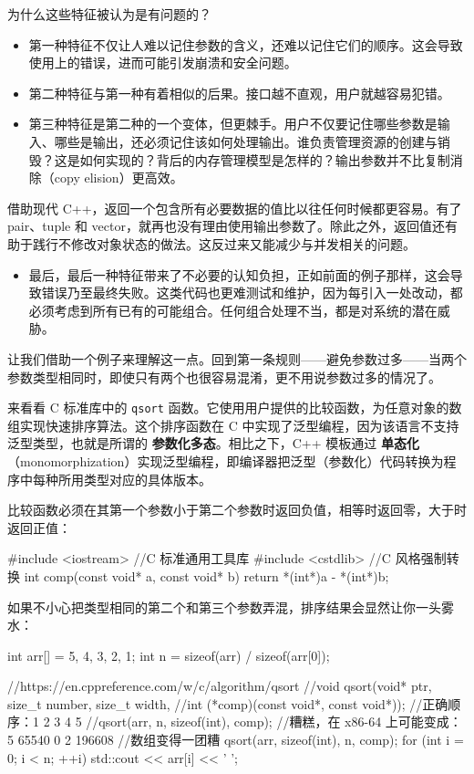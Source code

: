 为什么这些特征被认为是有问题的？

\begin{itemize}
\label{idx:998}
\item 第一种特征不仅让人难以记住参数的含义，还难以记住它们的顺序。这会导致使用上的错误，进而可能引发崩溃和安全问题。
\item 第二种特征与第一种有着相似的后果。接口越不直观，用户就越容易犯错。
\item 第三种特征是第二种的一个变体，但更棘手。用户不仅要记住哪些参数是输入、哪些是输出，还必须记住该如何处理输出。谁负责管理资源的创建与销毁？这是如何实现的？背后的内存管理模型是怎样的？输出参数并不比复制消除（copy elision）更高效。
\end{itemize}

借助现代 C++，返回一个包含所有必要数据的值比以往任何时候都更容易。有了 pair、tuple 和 vector，就再也没有理由使用输出参数了。除此之外，返回值还有助于践行不修改对象状态的做法。这反过来又能减少与并发相关的问题。

\begin{itemize}
\item 最后，最后一种特征带来了不必要的认知负担，正如前面的例子那样，这会导致错误乃至最终失败。这类代码也更难测试和维护，因为每引入一处改动，都必须考虑到所有已有的可能组合。任何组合处理不当，都是对系统的潜在威胁。
\end{itemize}

让我们借助一个例子来理解这一点。回到第一条规则——避免参数过多——当两个参数类型相同时，即使只有两个也很容易混淆，更不用说参数过多的情况了。

\label{idx:999}
\label{idx:1000}
\label{idx:1001}
来看看 C 标准库中的 \texttt{qsort} 函数。它使用用户提供的比较函数，为任意对象的数组实现快速排序算法。这个排序函数在 C 中实现了泛型编程，因为该语言不支持泛型类型，也就是所谓的 \textbf{参数化多态}。相比之下，C++ 模板通过 \textbf{单态化}（monomorphization）实现泛型编程，即编译器把泛型（参数化）代码转换为程序中每种所用类型对应的具体版本。

比较函数必须在其第一个参数小于第二个参数时返回负值，相等时返回零，大于时返回正值：

\begin{codebox}[cpp]
#include <iostream>
//C 标准通用工具库
#include <cstdlib>
//C 风格强制转换
int comp(const void* a, const void* b) {
  return *(int*)a - *(int*)b;
}
\end{codebox}

如果不小心把类型相同的第二个和第三个参数弄混，排序结果会显然让你一头雾水：

\begin{codebox}[cpp]
  int arr[] = {5, 4, 3, 2, 1};
  int n = sizeof(arr) / sizeof(arr[0]);
 
  //https://en.cppreference.com/w/c/algorithm/qsort
  //void qsort(void* ptr, size_t number, size_t width,
  //int (*comp)(const void*, const void*));
  //正确顺序：1 2 3 4 5
  //qsort(arr, n, sizeof(int), comp);
  //糟糕，在 x86-64 上可能变成：5 65540 0 2 196608
  //数组变得一团糟
  qsort(arr, sizeof(int), n, comp);
  for (int i = 0; i < n; ++i) {
    std::cout << arr[i] << ' ';
  }
\end{codebox}

